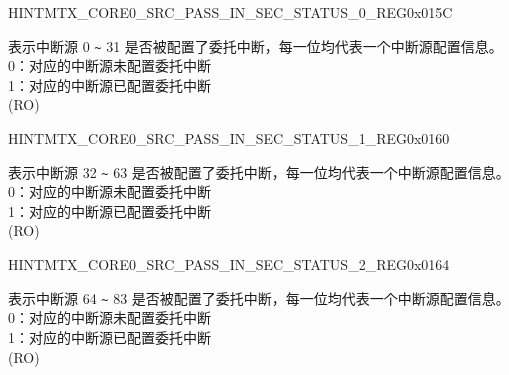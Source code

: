 \begin{register}{H}{INTMTX\_CORE0\_SRC\_PASS\_IN\_SEC\_STATUS\_0\_REG}{0x015C}\label{regdesc:INTMTXCORE0SRCPASSINSECSTATUS0REG}
%
\regnewline%
\begin{regdesc}\begin{reglist}
\label{fielddesc:INTMTXCORE0INTSRCPASSINSECSTATUS0}\item [INTMTX\_CORE0\_INT\_SRC\_PASS\_IN\_SEC\_STATUS\_0] 表示中断源 0 \verb+~+ 31 是否被配置了委托中断，每一位均代表一个中断源配置信息。\\

0：对应的中断源未配置委托中断\\
1：对应的中断源已配置委托中断\\ (RO)
\end{reglist}\end{regdesc}
\end{register}


\begin{register}{H}{INTMTX\_CORE0\_SRC\_PASS\_IN\_SEC\_STATUS\_1\_REG}{0x0160}\label{regdesc:INTMTXCORE0SRCPASSINSECSTATUS1REG}
%
\regnewline%
\begin{regdesc}\begin{reglist}
\label{fielddesc:INTMTXCORE0INTSRCPASSINSECSTATUS1}\item [INTMTX\_CORE0\_INT\_SRC\_PASS\_IN\_SEC\_STATUS\_1] 表示中断源 32 \verb+~+ 63 是否被配置了委托中断，每一位均代表一个中断源配置信息。\\

0：对应的中断源未配置委托中断\\
1：对应的中断源已配置委托中断\\ (RO)
\end{reglist}\end{regdesc}
\end{register}


\begin{register}{H}{INTMTX\_CORE0\_SRC\_PASS\_IN\_SEC\_STATUS\_2\_REG}{0x0164}\label{regdesc:INTMTXCORE0SRCPASSINSECSTATUS2REG}
%
%
\regnewline%
\begin{regdesc}\begin{reglist}
\label{fielddesc:INTMTXCORE0INTSRCPASSINSECSTATUS2}\item [INTMTX\_CORE0\_INT\_SRC\_PASS\_IN\_SEC\_STATUS\_2] 表示中断源 64 \verb+~+ 83 是否被配置了委托中断，每一位均代表一个中断源配置信息。\\

0：对应的中断源未配置委托中断\\
1：对应的中断源已配置委托中断\\ (RO)
\end{reglist}\end{regdesc}
\end{register}


